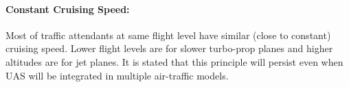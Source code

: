 \paragraph{Constant Cruising Speed:} Most of traffic attendants at same flight level have similar (close to constant) cruising speed. Lower flight levels are for slower turbo-prop planes and higher altitudes are for jet planes. It is stated that this principle will persist even when UAS will be integrated \cite{bayen2005langrangian,kopardekar2002dynamic,helme1992optimization} in multiple air-traffic models.


